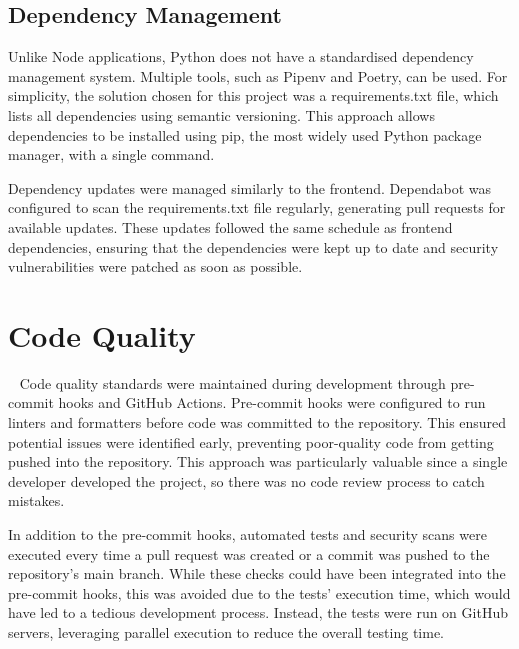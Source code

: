 \subsection{Dependency Management}
Unlike Node applications, Python does not have a standardised dependency management system. Multiple tools, such as Pipenv and Poetry, can be used. For simplicity, the solution chosen for this project was a requirements.txt file, which lists all dependencies using semantic versioning. This approach allows dependencies to be installed using pip, the most widely used Python package manager, with a single command.

Dependency updates were managed similarly to the frontend. Dependabot was configured to scan the requirements.txt file regularly, generating pull requests for available updates. These updates followed the same schedule as frontend dependencies, ensuring that the dependencies were kept up to date and security vulnerabilities were patched as soon as possible.

\section{Code Quality}~\label{sec:code-quality}
Code quality standards were maintained during development through pre-commit hooks and GitHub Actions. Pre-commit hooks were configured to run linters and formatters before code was committed to the repository. This ensured potential issues were identified early, preventing poor-quality code from getting pushed into the repository. This approach was particularly valuable since a single developer developed the project, so there was no code review process to catch mistakes.

In addition to the pre-commit hooks, automated tests and security scans were executed every time a pull request was created or a commit was pushed to the repository's main branch. While these checks could have been integrated into the pre-commit hooks, this was avoided due to the tests' execution time, which would have led to a tedious development process. Instead, the tests were run on GitHub servers, leveraging parallel execution to reduce the overall testing time.

